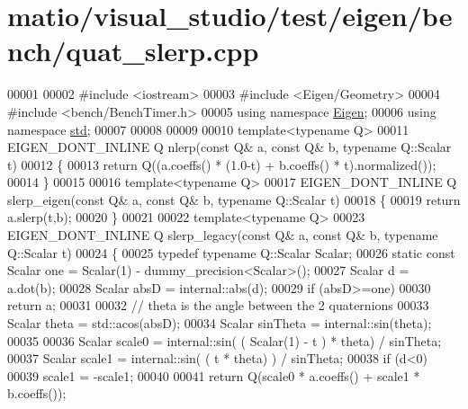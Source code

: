 \hypertarget{matio_2visual__studio_2test_2eigen_2bench_2quat__slerp_8cpp_source}{}\section{matio/visual\+\_\+studio/test/eigen/bench/quat\+\_\+slerp.cpp}
\label{matio_2visual__studio_2test_2eigen_2bench_2quat__slerp_8cpp_source}

\begin{DoxyCode}
00001 
00002 \textcolor{preprocessor}{#include <iostream>}
00003 \textcolor{preprocessor}{#include <Eigen/Geometry>}
00004 \textcolor{preprocessor}{#include <bench/BenchTimer.h>}
00005 \textcolor{keyword}{using namespace }\hyperlink{namespace_eigen}{Eigen};
00006 \textcolor{keyword}{using namespace }\hyperlink{namespacestd}{std};
00007 
00008 
00009 
00010 \textcolor{keyword}{template}<\textcolor{keyword}{typename} Q>
00011 EIGEN\_DONT\_INLINE Q nlerp(\textcolor{keyword}{const} Q& a, \textcolor{keyword}{const} Q& b, \textcolor{keyword}{typename} Q::Scalar t)
00012 \{
00013   \textcolor{keywordflow}{return} Q((a.coeffs() * (1.0-t) + b.coeffs() * t).normalized());
00014 \}
00015 
00016 \textcolor{keyword}{template}<\textcolor{keyword}{typename} Q>
00017 EIGEN\_DONT\_INLINE Q slerp\_eigen(\textcolor{keyword}{const} Q& a, \textcolor{keyword}{const} Q& b, \textcolor{keyword}{typename} Q::Scalar t)
00018 \{
00019   \textcolor{keywordflow}{return} a.slerp(t,b);
00020 \}
00021 
00022 \textcolor{keyword}{template}<\textcolor{keyword}{typename} Q>
00023 EIGEN\_DONT\_INLINE Q slerp\_legacy(\textcolor{keyword}{const} Q& a, \textcolor{keyword}{const} Q& b, \textcolor{keyword}{typename} Q::Scalar t)
00024 \{
00025   \textcolor{keyword}{typedef} \textcolor{keyword}{typename} Q::Scalar Scalar;
00026   \textcolor{keyword}{static} \textcolor{keyword}{const} Scalar one = Scalar(1) - dummy\_precision<Scalar>();
00027   Scalar d = a.dot(b);
00028   Scalar absD = internal::abs(d);
00029   \textcolor{keywordflow}{if} (absD>=one)
00030     \textcolor{keywordflow}{return} a;
00031 
00032   \textcolor{comment}{// theta is the angle between the 2 quaternions}
00033   Scalar theta = std::acos(absD);
00034   Scalar sinTheta = internal::sin(theta);
00035 
00036   Scalar scale0 = internal::sin( ( Scalar(1) - t ) * theta) / sinTheta;
00037   Scalar scale1 = internal::sin( ( t * theta) ) / sinTheta;
00038   \textcolor{keywordflow}{if} (d<0)
00039     scale1 = -scale1;
00040 
00041   \textcolor{keywordflow}{return} Q(scale0 * a.coeffs() + scale1 * b.coeffs());

\end{DoxyCode}
